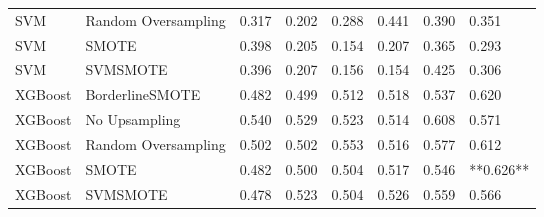 \begin{tabular}{llllllll}
                         SVM & Random Oversampling & 0.317 &                     0.202 &                 0.288 &                  0.441 &                                   0.390 &     0.351 \\
                         SVM &               SMOTE & 0.398 &                     0.205 &                 0.154 &                  0.207 &                                   0.365 &     0.293 \\
                         SVM &            SVMSMOTE & 0.396 &                     0.207 &                 0.156 &                  0.154 &                                   0.425 &     0.306 \\
                     XGBoost &     BorderlineSMOTE & 0.482 &                     0.499 &                 0.512 &                  0.518 &                                   0.537 &     0.620 \\
                     XGBoost &       No Upsampling & 0.540 &                     0.529 &                 0.523 &                  0.514 &                                   0.608 &     0.571 \\
                     XGBoost & Random Oversampling & 0.502 &                     0.502 &                 0.553 &                  0.516 &                                   0.577 &     0.612 \\
                     XGBoost &               SMOTE & 0.482 &                     0.500 &                 0.504 &                  0.517 &                                   0.546 & **0.626** \\
                     XGBoost &            SVMSMOTE & 0.478 &                     0.523 &                 0.504 &                  0.526 &                                   0.559 &     0.566 \\
\bottomrule
\end{tabular}
